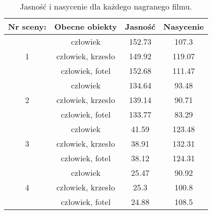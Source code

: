 \begin{table}[H]
    \centering
    \caption{Jasność i nasycenie dla każdego nagranego filmu.}
    \begin{tabular}{|c|c|c|c|}
    \hline
    Nr sceny:          & Obecne obiekty    & Jasność & Nasycenie \\ \hline
    \multirow{3}{*}{1} & człowiek          & 152.73  & 107.3     \\ \cline{2-4} 
                       & człowiek, krzesło & 149.92  & 119.07    \\ \cline{2-4} 
                       & człowiek, fotel   & 152.68  & 111.47    \\ \hline
    \multirow{3}{*}{2} & człowiek          & 134.64  & 93.48     \\ \cline{2-4} 
                       & człowiek, krzesło & 139.14  & 90.71     \\ \cline{2-4} 
                       & człowiek, fotel   & 133.77  & 83.29     \\ \hline
    \multirow{3}{*}{3} & człowiek          & 41.59   & 123.48    \\ \cline{2-4} 
                       & człowiek, krzesło & 38.91   & 132.31    \\ \cline{2-4} 
                       & człowiek, fotel   & 38.12   & 124.31    \\ \hline
    \multirow{3}{*}{4} & człowiek          & 25.47   & 90.92     \\ \cline{2-4} 
                       & człowiek, krzesło & 25.3    & 100.8     \\ \cline{2-4} 
                       & człowiek, fotel   & 24.88   & 108.5     \\ \hline
    \end{tabular}
    \label{tab:saturation-value-table}
    \end{table}